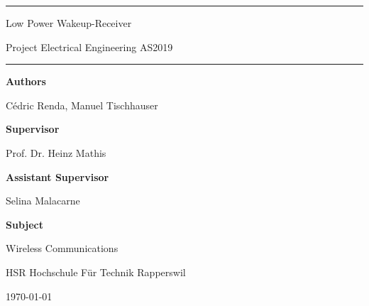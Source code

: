 \documentclass[a4paper,12pt]{book}
\begin{document}
\pagestyle{fancy}
\lhead{}
\rhead{}
\frontmatter
\newcommand\HRule{\noindent\rule{\linewidth}{1.5pt}}



\hypersetup{
	colorlinks=true,
	linktoc=all,
	linkcolor=blue
}


\newtheorem{satz}{Theorem}[chapter]
\newtheorem{problem}[satz]{Problem}
\newtheorem{hilfssatz}[satz]{Lemma}
\newtheorem{definition}[satz]{Definition}
\newtheorem{annahme}[satz]{Assumption}
\newtheorem{aufgabe}[satz]{Task}
\newenvironment{beispiel}[1][Example]{%
	\begin{proof}[#1]%
		\renewcommand{\qedsymbol}{$\bigcirc$}
	}{\end{proof}}


\begin{titlepage}
\HRule
\vspace*{10pt}
\begin{flushright}
{\Huge
Low Power Wakeup-Receiver}

\end{flushright}
\begin{flushright}
{\Large Project Electrical Engineering AS2019}
\end{flushright}
\HRule

\vspace{70pt}
\large
\textbf{Authors}

Cédric Renda, Manuel Tischhauser

\textbf{Supervisor}

Prof. Dr. Heinz Mathis

\textbf{Assistant Supervisor}

Selina Malacarne

\textbf{Subject}

Wireless Communications



\begin{center}
HSR Hochschule Für Technik Rapperswil

\today
\end{center}
\end{titlepage}



\tableofcontents

\mainmatter








\end{document}
